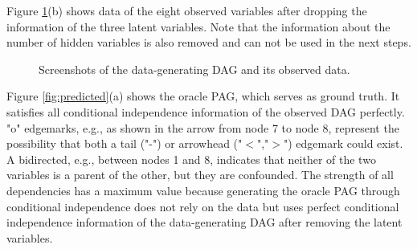 \documentclass[conference]{IEEEtran}
\begin{document}
Figure \ref{fig:DAG}(b) shows data of the eight observed variables after dropping the information of the three latent variables. Note that the information about the number of hidden variables is also removed and can not be used in the next steps.
\begin{figure}[htbp]
    \centering
    \caption{Screenshots of the data-generating DAG and its observed data.}
        \label{fig:DAG}
\end{figure}


Figure \ref{fig:predicted}(a) shows the oracle PAG, which serves as ground truth. It satisfies all conditional independence information of the observed DAG perfectly.
"o" edgemarks, e.g., as shown in the arrow from node 7 to node 8, represent the possibility that both a tail ("-") or arrowhead ("$<$","$>$") edgemark could exist.
A bidirected, e.g., between nodes 1 and 8, indicates that neither of the two variables is a parent of the other, but they are confounded.
The strength of all dependencies has a maximum value because generating the oracle PAG through conditional independence does not rely on the data but uses perfect conditional independence information of the data-generating DAG after removing the latent variables.
\end{document}
